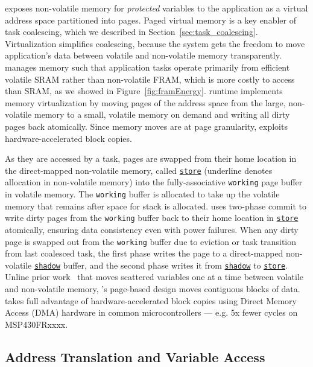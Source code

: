 \sys exposes non-volatile memory for \emph{protected} variables to
the application as a virtual address space partitioned into pages.
Paged virtual memory is a key enabler of task coalescing, which
we described in Section~\ref{sec:task_coalescing}. Virtualization simplifies
coalescing, because the system gets the freedom to move application's data
between volatile and non-volatile memory transparently.
%
\sys manages memory such that application tasks operate primarily from
efficient volatile SRAM rather than non-volatile FRAM, which is more costly to access than SRAM,
as we showed in Figure~\ref{fig:framEnergy}. \sys runtime implements memory
virtualization by moving pages of the address space from the large,
non-volatile memory to a small, volatile memory on demand and writing all dirty
pages back atomically. Since memory moves are at page granularity, \sys
exploits hardware\hyp{}accelerated block copies.


As they are
accessed by a task, pages are swapped from their home location
in the direct\hyp{}mapped non-volatile memory, called
\texttt{\underline{store}} (underline denotes allocation in non-volatile
memory) into the fully\hyp{}associative \texttt{working} page buffer in volatile memory. The
\texttt{working} buffer is allocated to take up the volatile memory that
remains after space for stack is allocated.
%
\sys uses two-phase commit to write dirty pages from the \texttt{working} buffer
back to their home location in \texttt{\underline{store}} atomically,
ensuring data consistency even with power failures.
%
When any dirty page is swapped out from the \texttt{working} buffer due to
eviction or task transition from last coalesced task, the first phase writes
the page to a direct\hyp{}mapped non-volatile \texttt{\underline{shadow}}
buffer, and the second phase writes it from
\texttt{\underline{shadow}} to \texttt{\underline{store}}.
%
Unline prior work~\cite{chain,alpaca} that moves scattered variables one at a
time between volatile and non-volatile memory, \sys's page-based
design moves contiguous blocks of data.
%
\sys takes full advantage of hardware\hyp{}accelerated block copies using
Direct Memory Access (DMA) hardware in common microcontrollers --- e.g. 5x
fewer cycles on MSP430FRxxxx.

\subsection{Address Translation and Variable Access}


